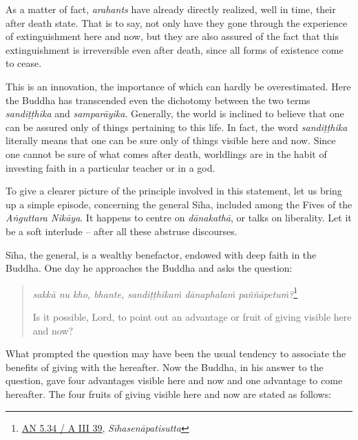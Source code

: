 As a matter of fact, \emph{arahants} have already directly realized, well in time, their after death state. That is to say, not only have they gone through the experience of extinguishment here and now, but they are also assured of the fact that this extinguishment is irreversible even after death, since all forms of existence come to cease.

This is an innovation, the importance of which can hardly be overestimated. Here the Buddha has transcended even the dichotomy between the two terms \emph{sandiṭṭhika} and \emph{samparāyika}. Generally, the world is inclined to believe that one can be assured only of things pertaining to this life. In fact, the word \emph{sandiṭṭhika} literally means that one can be sure only of things visible here and now. Since one cannot be sure of what comes after death, worldlings are in the habit of investing faith in a particular teacher or in a god.

To give a clearer picture of the principle involved in this statement, let us bring up a simple episode, concerning the general Sīha, included among the Fives of the \emph{Aṅguttara Nikāya}. It happens to centre on \emph{dānakathā}, or talks on liberality. Let it be a soft interlude -- after all these abstruse discourses.

Sīha, the general, is a wealthy benefactor, endowed with deep faith in the Buddha. One day he approaches the Buddha and asks the question:

\clearpage

\begin{quote}
\emph{sakkā nu kho, bhante, sandiṭṭhikaṁ dānaphalaṁ paññāpetuṁ?}\footnote{\href{https://suttacentral.net/an5.34/pli/ms}{AN 5.34 / A III 39}, \emph{Sīhasenāpatisutta}}

Is it possible, Lord, to point out an advantage or fruit of giving visible here and now?
\end{quote}

What prompted the question may have been the usual tendency to associate the benefits of giving with the hereafter. Now the Buddha, in his answer to the question, gave four advantages visible here and now and one advantage to come hereafter. The four fruits of giving visible here and now are stated as follows:

